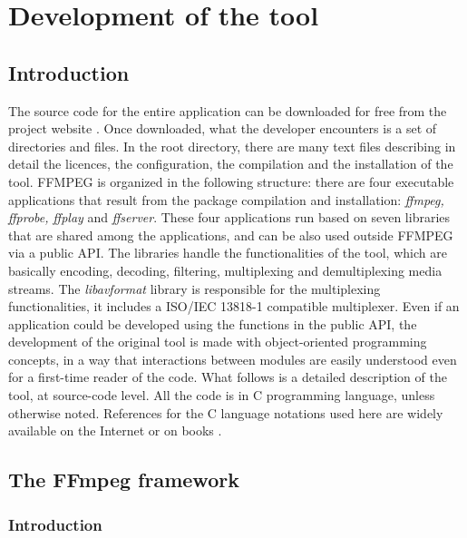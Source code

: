 \documentclass[
	12pt,				%
	openright,			%
	twoside,			%
	a4paper,			%
	brazil,
	french,				%
	english
	]{abntex2}
\begin{document}
\chapter{Development of the tool}

\section{Introduction}

The source code for the entire application can be downloaded for free from the project website \cite{ffmpeg}. Once downloaded, what the developer encounters is a set of directories and files. In the root directory, there are many text files describing in detail the licences, the configuration, the compilation and the installation of the tool. FFMPEG is organized in the following structure: there are four executable applications that result from the package compilation and installation: \textit{ffmpeg, ffprobe, ffplay} and \textit{ffserver}. These four applications run based on seven libraries that are shared among the applications, and can be also used outside FFMPEG via a public API. The libraries handle the functionalities of the tool, which are basically encoding, decoding, filtering, multiplexing and demultiplexing media streams. The \textit{libavformat} library is responsible for the multiplexing functionalities, it includes a ISO/IEC 13818-1 compatible multiplexer. Even if an application could be developed using the functions in the public API, the development of the original tool is made with object-oriented programming concepts, in a way that interactions between modules are easily understood even for a first-time reader of the code. What follows is a detailed description of the tool, at source-code level. All the code is in C programming language, unless otherwise noted. References for the C language notations used here are widely available on the Internet \cite{cpp_reference} or on books \cite{ritchie}.

\section{The FFmpeg framework}

\subsection{Introduction}
\end{document}
